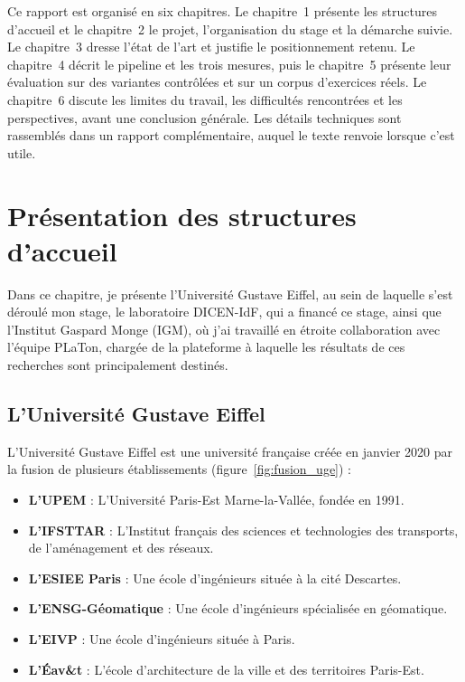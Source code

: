 \documentclass[12pt,a4paper,oneside]{report}
\begin{document}
Ce rapport est organisé en six chapitres. Le chapitre~1 présente les
structures d'accueil et le chapitre~2 le projet, l'organisation du stage
et la démarche suivie. Le chapitre~3 dresse l'état de l'art et justifie
le positionnement retenu. Le chapitre~4 décrit le pipeline et les trois
mesures, puis le chapitre~5 présente leur évaluation sur des variantes
contrôlées et sur un corpus d'exercices réels. Le chapitre~6 discute les
limites du travail, les difficultés rencontrées et les perspectives, avant
une conclusion générale. Les détails techniques sont rassemblés dans un
rapport complémentaire, auquel le texte renvoie lorsque c'est utile.

\chapter{Présentation des structures d'accueil}

Dans ce chapitre, je présente l'Université Gustave Eiffel, au sein de
laquelle s'est déroulé mon stage, le laboratoire DICEN-IdF, qui a financé
ce stage, ainsi que l'Institut Gaspard Monge (IGM), où j'ai travaillé en étroite
collaboration avec l'équipe PLaTon, chargée de la plateforme à laquelle
les résultats de ces recherches sont principalement destinés.



\section{L'Université Gustave Eiffel}

L'Université Gustave Eiffel est une université française créée en janvier 2020
 par la fusion de plusieurs établissements \cite{uge_decret_2019,uge_wikipedia}
 (figure~\ref{fig:fusion_uge}) :

\begin{itemize}
    \item \textbf{L'UPEM} : L'Université Paris-Est Marne-la-Vallée, fondée en 1991.
    \item \textbf{L'IFSTTAR} : L'Institut français des sciences et technologies des transports, de l'aménagement et des réseaux.
    \item \textbf{L'ESIEE Paris} : Une école d'ingénieurs située à la cité Descartes.
    \item \textbf{L'ENSG-Géomatique} : Une école d'ingénieurs spécialisée en géomatique.
    \item \textbf{L'EIVP} : Une école d'ingénieurs située à Paris.
    \item \textbf{L'Éav\&t} : L'école d'architecture de la ville et des territoires Paris-Est.
\end{itemize}
\end{document}

